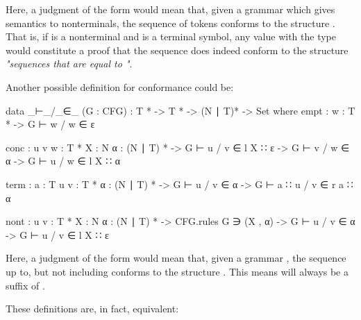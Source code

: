 	Here, a judgment of the form  would mean that, given a
	grammar  which gives semantics to nonterminals, the sequence of
	tokens  conforms to the structure . That is, if
	 is a nonterminal and  is a terminal symbol, any value
	with the type  would constitute a proof
	that the sequence  does indeed conform to the structure
	\emph{"sequences that are equal to "}.

	Another possible definition for conformance could be: 

	\begin{code}
	
		data _⊢_/_∈_ (G : CFG) : T * -> T * -> (N ∣ T)* -> Set where
		  empt : {w : T *} ->
		    G ⊢ w / w ∈ ε
		
		  conc : {u v w : T *} {X : N} {α : (N ∣ T) *} ->
		    G ⊢ u / v ∈ l X ∷ ε ->
		    G ⊢ v / w ∈ α ->
		      G ⊢ u / w ∈ l X ∷ α
		
		  term : {a : T} {u v : T *} {α : (N ∣ T) *} ->
		    G ⊢ u / v ∈ α ->
		      G ⊢ a ∷ u / v ∈ r a ∷ α
		
		  nont : {u v : T *} {X : N} {α : (N ∣ T) *} ->
		    CFG.rules G ∋ (X , α) ->
		    G ⊢ u / v ∈ α ->
		    G ⊢ u / v ∈ l X ∷ ε

	\end{code}

	Here, a judgment of the form  would mean that, given
	a grammar , the sequence  up to, but not including 
	 conforms to the structure . This means  will
	always be a suffix of .

	These definitions are, in fact, equivalent:

	\begin{code}
	
	\end{code}
